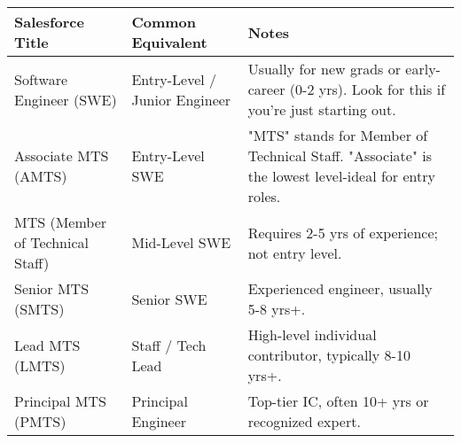 \documentclass[11pt]{article}
\begin{document}
\begin{tabular}{|l|l|l|}
\hline Salesforce Title & Common Equivalent & Notes \\
\hline Software Engineer (SWE) & Entry-Level / Junior Engineer & Usually for new grads or early-career (0-2 yrs). Look for this if you're just starting out. \\
\hline Associate MTS (AMTS) & Entry-Level SWE & "MTS" stands for Member of Technical Staff. "Associate" is the lowest level-ideal for entry roles. \\
\hline MTS (Member of Technical Staff) & Mid-Level SWE & Requires 2-5 yrs of experience; not entry level. \\
\hline Senior MTS (SMTS) & Senior SWE & Experienced engineer, usually 5-8 yrs+. \\
\hline Lead MTS (LMTS) & Staff / Tech Lead & High-level individual contributor, typically 8-10 yrs+. \\
\hline Principal MTS (PMTS) & Principal Engineer & Top-tier IC, often 10+ yrs or recognized expert. \\
\hline
\end{tabular}
\end{document}
